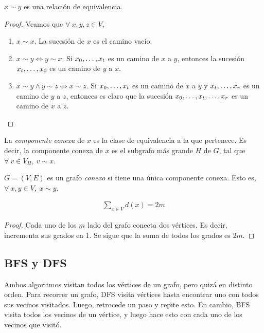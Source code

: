 \begin{proposition}
$x \sim y$ es una relación de equivalencia.
\end{proposition}
\begin{proof}
Veamos que $\forall~ x,y,z \in V,$
\begin{enumerate}
    \item $x \sim x$. La sucesión de $x$ es el camino vacío.
    
    \item $x \sim y \iff y \sim x$. Si $x_0, \mathellipsis, x_t$ es un camino de $x$ a $y$, entonces la sucesión $x_t, \mathellipsis, x_0$ es un camino de $y$ a $x$.
    \item $x \sim y \wedge y \sim z \iff x \sim z$. Si $x_0, \mathellipsis, x_t$ es un camino de $x$ a $y$ y $x_{t}, \mathellipsis, x_{r}$ es un camino de $y$ a $z$, entonces es claro que la sucesión $x_0, \mathellipsis, x_t, \mathellipsis, x_r$ es un camino de $x$ a $z$.
\end{enumerate}
\end{proof}
\begin{definition}
La \emph{componente conexa} de $x$ es la clase de equivalencia a la que pertenece. Es decir, la componente conexa de $x$ es el subgrafo más grande $H$ de $G$, tal que $\forall~v \in V_H,~ v \sim x$.

$G=(V,E)$ es un grafo \emph{conexo} si tiene una única componente conexa. Esto es, $\forall~x,y \in V,~x \sim y$.
\end{definition}

\begin{proposition}
\begin{align}
\sum_{x\in V} d(x) = 2m \label{handshaking_lemma}
\end{align}
\end{proposition}

\begin{proof}
Cada uno de los $m$ lado del grafo conecta dos vértices. Es decir, incrementa sus grados en 1. Se sigue que la suma de todos los grados es $2m$.
\end{proof}

\subsection{BFS y DFS}
Ambos algoritmos visitan todos los vértices de un grafo, pero quizá en distinto orden. Para recorrer un grafo, DFS visita vértices hasta encontrar uno con todos sus vecinos visitados. Luego, retrocede un paso y repite esto. En cambio, BFS visita todos los vecinos de un vértice, y luego hace esto con cada uno de los vecinos que visitó.

